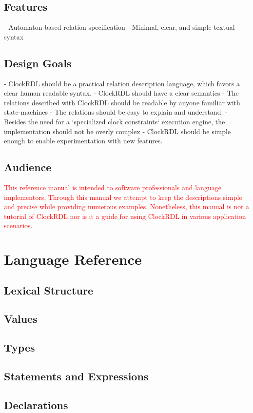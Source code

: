 \documentclass[11pt, oneside]{article}   	%
\begin{document}
\subsection{Features}
- Automaton-based relation specification
- Minimal, clear, and simple textual syntax

\subsection{Design Goals}
- ClockRDL should be a practical relation description language, which favors a clear human readable syntax.
- ClockRDL should have a clear semantics 
- The relations described with ClockRDL should be readable by anyone familiar with state-machines
- The relations should be easy to explain and understand.
- Besides the need for a `specialized clock constraints` execution engine, the implementation should not be overly complex
- ClockRDL should be simple enough to enable experimentation with new features.

\subsection{Audience}
\textcolor{red}{
This reference manual is intended to software professionals and language implementors. Through this manual we attempt to keep the descriptions simple and precise while providing numerous examples.
Nonetheless, this manual is not a tutorial of ClockRDL nor is it a guide for using ClockRDL in various application scenarios.
}

\section{Language Reference}
\subsection{Lexical Structure}
\subsection{Values}
\subsection{Types}
\subsection{Statements and Expressions}
\subsection{Declarations}
\end{document}
